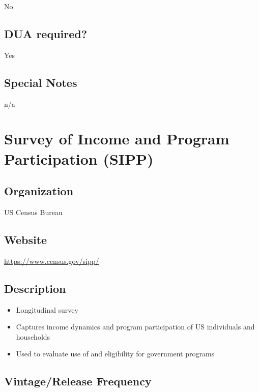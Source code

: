 \documentclass[
]{book}
\providecommand{\tightlist}{%
  \setlength{\itemsep}{0pt}\setlength{\parskip}{0pt}}
\begin{document}
No

\hypertarget{dua-required-86}{%
\section{DUA required?}\label{dua-required-86}}

Yes

\hypertarget{special-notes-86}{%
\section{Special Notes}\label{special-notes-86}}

n/a

\mainmatter

\hypertarget{survey-of-income-and-program-participation-sipp}{%
\chapter{Survey of Income and Program Participation (SIPP)}\label{survey-of-income-and-program-participation-sipp}}

\hypertarget{organization-87}{%
\section{Organization}\label{organization-87}}

US Census Bureau

\hypertarget{website-87}{%
\section{Website}\label{website-87}}

\url{https://www.census.gov/sipp/}

\hypertarget{description-87}{%
\section{Description}\label{description-87}}

\begin{itemize}
\tightlist
\item
  Longitudinal survey
\item
  Captures income dynamics and program participation of US individuals and households
\item
  Used to evaluate use of and eligibility for government programs
\end{itemize}

\hypertarget{vintagerelease-frequency-87}{%
\section{Vintage/Release Frequency}\label{vintagerelease-frequency-87}}
\end{document}
